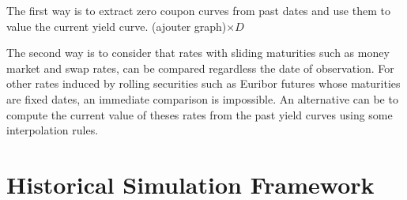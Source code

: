 \documentclass[10pt,a4paper]{report}
\begin{document}
\bigskip

The first way is to extract zero coupon curves from past dates and use them
to value the current yield curve. (ajouter graph)$\times D$

\bigskip

\bigskip

\bigskip

The second way is to consider that rates with sliding maturities such as
money market and swap rates, can be compared regardless the date of
observation. For other rates induced by rolling securities such as Euribor
futures whose maturities are fixed dates, an immediate comparison is
impossible. An alternative can be to compute the current value of theses
rates from the past yield curves using some interpolation rules.

\bigskip

\bigskip

\bigskip

\bigskip

\bigskip

\bigskip

\bigskip

\bigskip

\bigskip

\bigskip

\bigskip

\bigskip

\bigskip

\bigskip

\bigskip

\bigskip

\bigskip

\bigskip

\bigskip

\bigskip

\bigskip

\bigskip

\bigskip

\bigskip

\bigskip

\bigskip

\bigskip

\bigskip

\bigskip

\bigskip

\bigskip

\section{Historical Simulation Framework}
\end{document}
